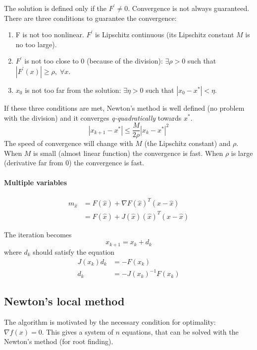 The solution is defined only if the $F^{\prime} \neq 0$.
Convergence is not always guaranteed. There are three conditions to guarantee the convergence:
\begin{enumerate}
\item F is not too nonlinear. $F^{\prime}$ is Lipschitz continuous (its Lipschitz constant $M$ is no too large).
\item $F^{\prime}$ is not too close to 0 (because of the division): $\exists \rho>0$ such that $|F^{\prime}(x)| \geq \rho,\;\forall x$.
\item $x_0$ is not too far from the solution: $\exists \eta>0$ such that $|x_0-x^*| < \eta$.
\end{enumerate}
If these three conditions are met, Newton's method is well defined (no problem with the division) and it converges \textit{q-quadratically} towards $x^*$.
\begin{equation}
    |x_{k+1}-x^*| \leq \frac{M}{2\rho} |x_{k}-x^*|^2
\end{equation}
The speed of convergence will change with $M$ (the Lipschitz constant) and $\rho$. When $M$ is small (almost linear function) the convergence is fast. When $\rho$ is large (derivative far from 0) the convergence is fast.
\paragraph{Multiple variables}


\begin{equation}
\begin{split}
    m_{\hat{x}} &= F(\hat{x}) + \nabla F(\hat{x})^T (x-\hat{x}) \\
    &= F(\hat{x}) + J(\hat{x})(\hat{x})^T (x-\hat{x})
\end{split}
\end{equation}

The iteration becomes
\begin{equation}
    x_{k+1}=x_k+d_k    
\end{equation}
where $d_k$ should satisfy the equation
\begin{equation}
    \begin{split}
        J(x_k)d_k & = -F(x_k) \\
        d_k & = -J(x_k)^{-1}F(x_k)
    \end{split}
\end{equation}

    


\subsection{Newton's local method}
The algorithm is motivated by the necessary condition for optimality: $\nabla f(x) = 0$. This gives a system of $n$ equations, that can be solved with the Newton's method (for root finding).

